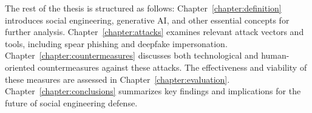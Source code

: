 %
%
The rest of the thesis is structured as follows: Chapter~\ref{chapter:definition} introduces social engineering, generative AI, and other essential concepts for further analysis. Chapter~\ref{chapter:attacks} examines relevant attack vectors and tools, including spear phishing and deepfake impersonation. Chapter~\ref{chapter:countermeasures} discusses both technological and human-oriented countermeasures against these attacks. The effectiveness and viability of these measures are assessed in Chapter~\ref{chapter:evaluation}. Chapter~\ref{chapter:conclusions} summarizes key findings and implications for the future of social engineering defense.






